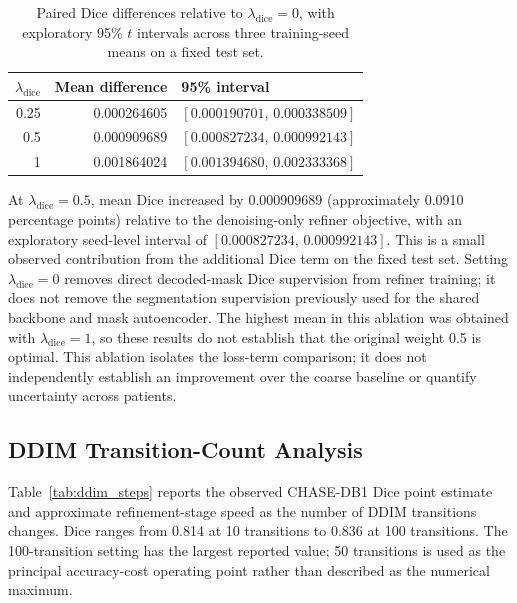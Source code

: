 \documentclass[jimaging,article,submit,pdftex,moreauthors]
  {Definitions/mdpi}
\begin{document}
\begin{table}[htbp]
\centering
\caption{Paired Dice differences relative to $\lambda_{\mathrm{dice}}=0$, with exploratory 95\% $t$ intervals across three training-seed means on a fixed test set.}
\label{tab:dice_weight_seed_intervals}
\small
\begin{tabular}{rrl}
\toprule
$\lambda_{\mathrm{dice}}$ & Mean difference & 95\% interval \\
\midrule
0.25 & 0.000264605 & $[0.000190701,\,0.000338509]$ \\
0.5 & 0.000909689 & $[0.000827234,\,0.000992143]$ \\
1 & 0.001864024 & $[0.001394680,\,0.002333368]$ \\
\bottomrule
\end{tabular}
\end{table}

At $\lambda_{\mathrm{dice}}=0.5$, mean Dice increased by 0.000909689 (approximately 0.0910 percentage points) relative to the denoising-only refiner objective, with an exploratory seed-level interval of $[0.000827234,\,0.000992143]$. This is a small observed contribution from the additional Dice term on the fixed test set. Setting $\lambda_{\mathrm{dice}}=0$ removes direct decoded-mask Dice supervision from refiner training; it does not remove the segmentation supervision previously used for the shared backbone and mask autoencoder. The highest mean in this ablation was obtained with $\lambda_{\mathrm{dice}}=1$, so these results do not establish that the original weight 0.5 is optimal. This ablation isolates the loss-term comparison; it does not independently establish an improvement over the coarse baseline or quantify uncertainty across patients.

\subsection{DDIM Transition-Count Analysis}

Table~\ref{tab:ddim_steps} reports the observed CHASE-DB1 Dice point estimate and approximate refinement-stage speed as the number of DDIM transitions changes. Dice ranges from 0.814 at 10 transitions to 0.836 at 100 transitions. The 100-transition setting has the largest reported value; 50 transitions is used as the principal accuracy-cost operating point rather than described as the numerical maximum.
\end{document}
